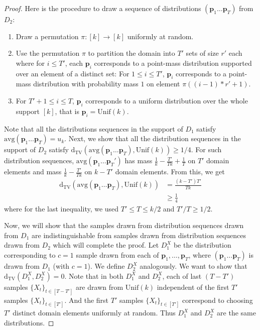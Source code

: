 \documentclass[10pt]{article} %
\theoremstyle{plain}
\newcommand{\bp}{\textbf{p}}
\newcommand{\unik}{\mathrm{Unif}(k)}%
\newcommand{\dtv}{\mathrm{d_{TV}}}
\newcommand{\avg}{\mathrm{avg}}
\begin{document}
\begin{proof}
	Here is the procedure to draw a sequence of distributions $(\bp_1\dots \bp_T)$ from $D_2$:
	
	\begin{enumerate}
		\item Draw a permutation $\pi:[k] \rightarrow [k]$ uniformly at random.
		\item Use the permutation $\pi$ to partition the domain into $T'$ sets of size $r'$ each where  for $i \leq T'$, each $\bp_i$ corresponds to a point-mass distribution supported over an element of a distinct set: For $1 \leq i \leq T'$, $\bp_i$ corresponds to a point-mass distribution with probability mass $1$ on element $\pi\left((i-1)*r'+1\right)$.
		\item For $T'+1 \leq i \leq T$, $\bp_i$ corresponds to a uniform distribution over the whole support $[k]$, that is $\bp_i = \unik$.
	\end{enumerate}
	
	Note that all the distributions sequences in the support of $D_1$ satisfy $\avg(\bp_1\dots \bp_T) = u_k$.  Next, we show that all the distribution sequences in the support of $D_2$ satisfy $\dtv(\avg(\bp_1\dots \bp_T),\unik) \geq 1/4$. For such distribution sequences, $\avg(\bp_1\dots \bp_T')$ has mass  $\frac{1}{k} - \frac{T'}{Tk} + \frac{1}{T}$ on $T'$ domain elements and mass $\frac{1}{k} - \frac{T'}{Tk}$ on $k - T'$ domain elements. From this, we get 
	\begin{align*}
		\dtv(\avg(\bp_1\dots \bp_T),\unik) &= \frac{(k - T') T'}{Tk}\\
		&\geq \frac{1}{4}
	\end{align*}
	where for the last inequality, we used $T' \leq T \leq k/2$ and $T'/T \geq 1/2$.
	
	Now, we will show that the samples drawn from distribution sequences drawn from $D_1$ are indistinguishable from samples drawn from distribution sequences drawn from $D_2$ which will complete the proof. Let $D_1^X$ be the distribution corresponding to $c=1$ sample drawn from each of $\bp_1,\dots,\bp_T$, where $(\bp_1\dots \bp_T)$ is drawn from $D_1$ (with $c = 1$). We define $D_2^X$ analogously. We want to show that $\dtv(D_1^X, D_2^X) = 0$. Note that in both $D_1^X$ and $D_2^X$, each of last $(T-T')$ samples $\{X_t\}_{t \in [T - T']}$ are drawn from $\unik$ independent of the first $T'$ samples $\{X_t\}_{t \in [T']}$. And the first $T'$ samples $\{X_t\}_{t \in [T']}$ correspond to choosing $T'$ distinct domain elements uniformly at random. Thus $D_1^X$ and $D_2^X$ are the same distributions.
	
	
	
	
	
\end{proof}
\end{document}
